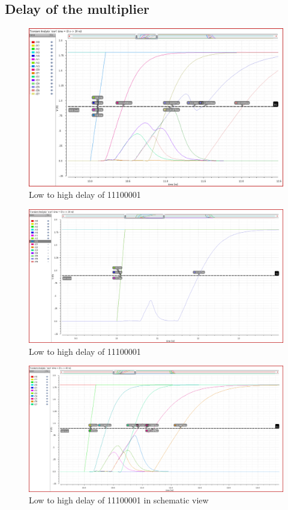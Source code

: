 \documentclass[conference]{IEEEtran}
\begin{document}
\subsection{Delay of the multiplier}


\begin{figure}[h!]
    \centering
    \includegraphics[width=0.9\linewidth]{mul_11100001_up_all.png}
    \caption{Low to high delay of 11100001}
\end{figure}

\begin{figure}[h!]
    \centering
    \includegraphics[width=0.9\linewidth]{mul_11100001_up_max.png}
    \caption{Low to high delay of 11100001}
\end{figure}

\begin{figure}[h!]
    \centering
    \includegraphics[width=0.9\linewidth]{mul_sch_up_all.png}
    \caption{Low to high delay of 11100001 in schematic view}
\end{figure}
\end{document}
